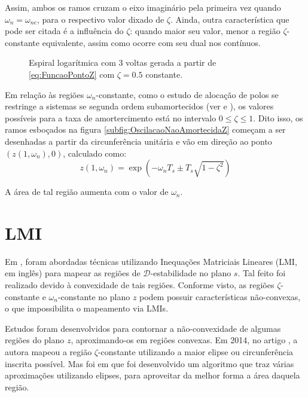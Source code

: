 Assim, ambos os ramos cruzam o eixo imaginário pela primeira vez quando $\omega_n = \omega_{ne}$, para o respectivo valor dixado de $\zeta$. Ainda, outra característica que pode ser citada é a influência do $\zeta$: quando maior seu valor, menor a região $\zeta$-constante equivalente, assim como ocorre com seu dual nos contínuos.

\begin{figure}[!ht]
  \centering
  
  \caption{Espiral logarítmica com 3 voltas gerada a partir de \eqref{eq:FuncaoPontoZ} com $\zeta=0.5$ constante.}
  \label{fig:EspiralLogaritmica}
\end{figure}

Em relação às regiões $\omega_n$-constante, como o estudo de alocação de polos se restringe a sistemas se segunda ordem subamortecidos (ver \cite{NISE2011} e \cite{OGATA2011}), os valores possíveis para a taxa de amortercimento está no intervalo $0 \leq \zeta \leq 1$. Dito isso, os ramos esboçados na figura \ref{subfig:OscilacaoNaoAmortecidaZ} começam a ser desenhadas a partir da circunferência unitária e vão em direção ao ponto $(z(1,\omega_n),0)$, calculado como:
\begin{equation}
  z(1,\omega_n) = \exp{\left(-\omega_nT_s \pm T_s\sqrt{1-\zeta^2}\right)}\label{eq:PontoExtremoWnZ}
\end{equation}

A área de tal região aumenta com o valor de $\omega_n$.

\section{LMI}
Em \cite{CHILALI1996}, foram abordadas técnicas utilizando Inequações Matriciais Lineares (LMI, em inglês) para mapear as regiões de $\mathscr{D}$-estabilidade no plano $s$. Tal feito foi realizado devido à convexidade de tais regiões. Conforme visto, as regiões $\zeta$-constante e $\omega_n$-constante no plano $z$ podem possuir características não-convexas, o que impossibilita o mapeamento via LMIs.

Estudos foram desenvolvidos para contornar a não-convexidade de algumas regiões do plano $z$, aproximando-os em regiões convexas. Em 2014, no artigo \cite{ROSINOVA2014}, a autora mapeou a região $\zeta$-constante utilizando a maior elipse ou circunferência inscrita possível. Mas foi em \cite{ROSINOVA2019} que foi desenvolvido um algoritmo que traz várias aproximações utilizando elipses, para aproveitar da melhor forma a área daquela região.

